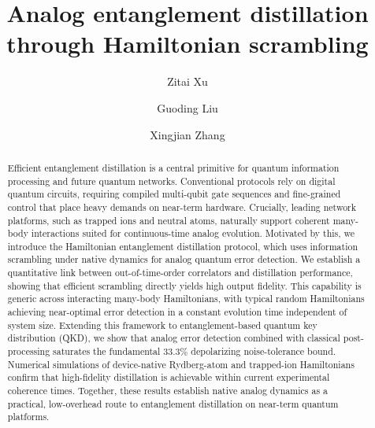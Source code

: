 \documentclass[onecolumn,prx,longbibliography,nofootinbib, superscriptaddress]{revtex4-2}
\theoremstyle{recap}
\begin{document}
\title{Analog entanglement distillation through Hamiltonian scrambling}

\author{Zitai Xu}

\author{Guoding Liu}

\author{Xingjian Zhang}


\begin{abstract}
    Efficient entanglement distillation is a central primitive for quantum information processing and future quantum networks. Conventional protocols rely on digital quantum circuits, requiring compiled multi-qubit gate sequences and fine-grained control that place heavy demands on near-term hardware. Crucially, leading network platforms, such as trapped ions and neutral atoms, naturally support coherent many-body interactions suited for continuous-time analog evolution. Motivated by this, we introduce the Hamiltonian entanglement distillation protocol, which uses information scrambling under native dynamics for analog quantum error detection. We establish a quantitative link between out-of-time-order correlators and distillation performance, showing that efficient scrambling directly yields high output fidelity. This capability is generic across interacting many-body Hamiltonians, with typical random Hamiltonians achieving near-optimal error detection in a constant evolution time independent of system size. Extending this framework to entanglement-based quantum key distribution (QKD), we show that analog error detection combined with classical post-processing saturates the fundamental $33.3\%$ depolarizing noise-tolerance bound. Numerical simulations of device-native Rydberg-atom and trapped-ion Hamiltonians confirm that high-fidelity distillation is achievable within current experimental coherence times. Together, these results establish native analog dynamics as a practical, low-overhead route to entanglement distillation on near-term quantum platforms.
\end{abstract}

\maketitle
\end{document}
